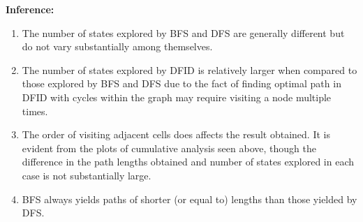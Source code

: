 \documentclass{article}
\begin{document}
\textbf{Inference: }
\begin{enumerate}
    \item The number of states explored by BFS and DFS are generally different but do not vary substantially among themselves.
    \item The number of states explored by DFID is relatively larger when compared to those explored by BFS and DFS due to the fact of finding optimal path in DFID with cycles within the graph may require visiting a node multiple times.
    \item The order of visiting adjacent cells does affects the result obtained. It is evident from the plots of cumulative analysis seen above, though the difference in the path lengths obtained and number of states explored in each case is not substantially large.
    \item BFS always yields paths of shorter (or equal to) lengths than those yielded by DFS.
\end{enumerate}
\end{document}
